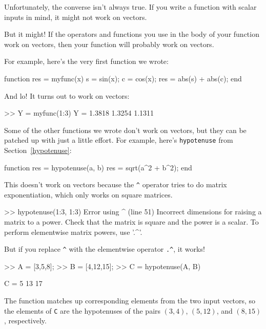 Unfortunately, the converse isn't always true.  If you write
a function with scalar inputs in mind, it might not work on vectors.

But it might!  If the operators and functions
you use in the body of your function work on vectors, then your
function will probably work on vectors.

For example, here's the very first function we wrote:

\begin{code}
function res = myfunc(x)
    s = sin(x);
    c = cos(x);
    res = abs(s) + abs(c);
end
\end{code}

And lo!  It turns out to work on vectors:

\begin{code}
>> Y = myfunc(1:3)
Y = 1.3818    1.3254    1.1311
\end{code}

Some of the other functions we wrote don't work on vectors,
but they can be patched up with just a little effort.  For example,
here's {\tt hypotenuse} from Section~\ref{hypotenuse}:

\begin{code}
function res = hypotenuse(a, b)
    res = sqrt(a^2 + b^2);
end
\end{code}

This doesn't work on vectors because the \verb+^+ operator
tries to do matrix exponentiation, which only works on
square matrices.


\begin{code}
>> hypotenuse(1:3, 1:3)
Error using  ^  (line 51)
Incorrect dimensions for raising a matrix to a power. 
Check that the matrix is square and the power is a scalar. 
To perform elementwise matrix powers, use '.^'.
\end{code}

But if you replace \verb+^+ with the elementwise operator
\verb+.^+, it works!


\begin{code}
>> A = [3,5,8];
>> B = [4,12,15];
>> C = hypotenuse(A, B)

C = 5    13    17
\end{code}

The function matches up corresponding elements from the two
input vectors, so the elements of {\tt C} are the hypotenuses of
the pairs $(3,4)$, $(5,12)$, and $(8,15)$, respectively.

